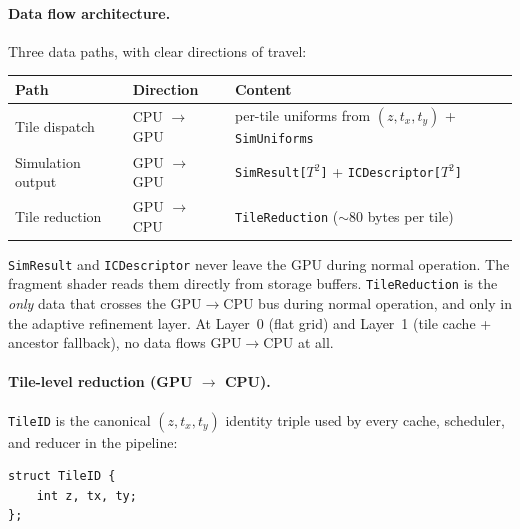 \documentclass[11pt]{report}
\begin{document}

\paragraph{Data flow architecture.}

Three data paths, with clear directions of travel:
\begin{center}
\begin{tabular}{lll}
\toprule
Path & Direction & Content \\
\midrule
Tile dispatch & CPU $\to$ GPU & per-tile uniforms from $(z, t_x, t_y)$ + \texttt{SimUniforms} \\
Simulation output & GPU $\to$ GPU & \texttt{SimResult[$T^2$]} + \texttt{ICDescriptor[$T^2$]} \\
Tile reduction & GPU $\to$ CPU & \texttt{TileReduction} ($\sim$80 bytes per tile) \\
\bottomrule
\end{tabular}
\end{center}

\texttt{SimResult} and \texttt{ICDescriptor} never leave the GPU during normal operation. The fragment shader reads them directly from storage buffers. \texttt{TileReduction} is the \emph{only} data that crosses the GPU$\to$CPU bus during normal operation, and only in the adaptive refinement layer. At Layer~0 (flat grid) and Layer~1 (tile cache + ancestor fallback), no data flows GPU$\to$CPU at all.


\paragraph{Tile-level reduction (GPU $\to$ CPU).}
\label{par:tile_reduction}

\texttt{TileID} is the canonical $(z, t_x, t_y)$ identity triple used by every cache, scheduler, and reducer in the pipeline:
\begin{verbatim}
struct TileID {
    int z, tx, ty;
};
\end{verbatim}
\end{document}
